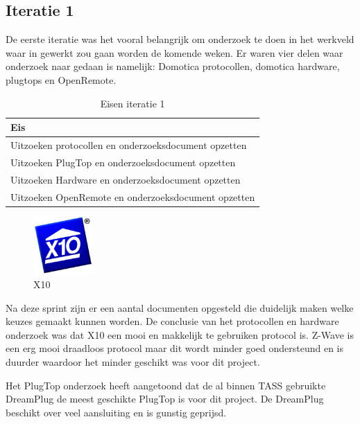 \documentclass[]{article}
\begin{document}
\subsection{Iteratie 1}
De eerste iteratie was het vooral belangrijk om onderzoek te doen in het
werkveld waar in gewerkt zou gaan worden de komende weken. Er waren vier
delen waar onderzoek naar gedaan is namelijk: Domotica protocollen,
domotica hardware, plugtops en OpenRemote.

\begin{table}[htpb]
  \caption{Eisen iteratie 1}
  \begin{center}
    \begin{tabular}{|| l ||}\hline
        Eis                                                  \\\hline\hline
        Uitzoeken protocollen en onderzoeksdocument opzetten \\\hline
        Uitzoeken PlugTop en onderzoeksdocument opzetten     \\\hline
        Uitzoeken Hardware en onderzoeksdocument opzetten    \\\hline
        Uitzoeken OpenRemote en onderzoeksdocument opzetten  \\\hline
    \end{tabular}
  \end{center}
\end{table}

\begin{figure}
  \begin{center}
    \includegraphics[width=0.20\textwidth]{x10.pdf}
  \end{center}
  \caption{X10}
\end{figure}

Na deze sprint zijn er een aantal documenten opgesteld die duidelijk maken
welke keuzes gemaakt kunnen worden. De conclusie van het protocollen en
hardware onderzoek was dat X10 een mooi en makkelijk te gebruiken protocol
is. Z-Wave is een erg mooi draadloos protocol maar dit wordt minder goed
ondersteund en is duurder waardoor het minder geschikt was voor dit
project.

Het PlugTop onderzoek heeft aangetoond dat de al binnen TASS gebruikte
DreamPlug de meest geschikte PlugTop is voor dit project. De DreamPlug
beschikt over veel aansluiting en is gunstig geprijsd.
\end{document}

